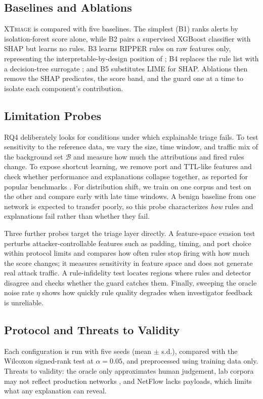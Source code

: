 \documentclass[journal]{IEEEtran}
\begin{document}
\subsection{Baselines and Ablations}
\textsc{XTriage} is compared with five baselines. The simplest (B1) ranks alerts by isolation-forest score alone, while B2 pairs a supervised XGBoost classifier with SHAP but learns no rules. B3 learns RIPPER rules on raw features only, representing the interpretable-by-design position of \cite{rudin}; B4 replaces the rule list with a decision-tree surrogate \cite{trustee}; and B5 substitutes LIME for SHAP. Ablations then remove the SHAP predicates, the score band, and the guard one at a time to isolate each component's contribution.

\subsection{Limitation Probes}
RQ4 deliberately looks for conditions under which explainable triage fails. To test sensitivity to the reference data, we vary the size, time window, and traffic mix of the background set $\mathcal{B}$ and measure how much the attributions and fired rules change. To expose shortcut learning, we remove port and TTL-like features and check whether performance and explanations collapse together, as reported for popular benchmarks \cite{engelen,trustee}. For distribution shift, we train on one corpus and test on the other and compare early with late time windows. A benign baseline from one network is expected to transfer poorly, so this probe characterizes \emph{how} rules and explanations fail rather than whether they fail.

Three further probes target the triage layer directly. A feature-space evasion test perturbs attacker-controllable features such as padding, timing, and port choice within protocol limits and compares how often rules stop firing with how much the score changes; it measures sensitivity in feature space and does not generate real attack traffic. A rule-infidelity test locates regions where rules and detector disagree and checks whether the guard catches them. Finally, sweeping the oracle noise rate $\eta$ shows how quickly rule quality degrades when investigator feedback is unreliable.

\subsection{Protocol and Threats to Validity}
Each configuration is run with five seeds (mean $\pm$ s.d.), compared with the Wilcoxon signed-rank test at $\alpha=0.05$, and preprocessed using training data only. Threats to validity: the oracle only approximates human judgement, lab corpora may not reflect production networks \cite{sommer}, and NetFlow lacks payloads, which limits what any explanation can reveal.
\end{document}
